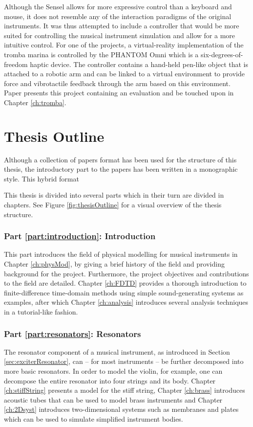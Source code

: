 Although the Sensel allows for more expressive control than a keyboard and mouse, it does not resemble any of the interaction paradigms of the original instruments. It was thus attempted to include a controller that would be more suited for controlling the musical instrument simulation and allow for a more intuitive control.
For one of the projects, a virtual-reality implementation of the tromba marina is controlled by the PHANTOM Omni \cite{phantom} which is a six-degrees-of-freedom haptic device. The controller contains a hand-held pen-like object that is attached to a robotic arm and can be linked to a virtual environment to provide force and vibrotactile feedback through the arm based on this environment. Paper \citeP[E] presents this project containing an evaluation and be touched upon in Chapter \ref{ch:tromba}.

\section{Thesis Outline} 
Although a collection of papers format has been used for the structure of this thesis, the introductory part to the papers has been written in a monographic style. This hybrid format  

This thesis is divided into several parts which in their turn are divided in chapters. See Figure \ref{fig:thesisOutline} for a visual overview of the thesis structure. 

\subsubsection{Part \ref{part:introduction}: Introduction}
This part introduces the field of physical modelling for musical instruments in Chapter \ref{ch:physMod}, by giving a brief history of the field and providing background for the project. Furthermore, the project objectives and contributions to the field are detailed. Chapter \ref{ch:FDTD} provides a thorough introduction to finite-difference time-domain methods using simple sound-generating systems as examples, after which Chapter \ref{ch:analysis} introduces several analysis techniques in a tutorial-like fashion.

\subsubsection{Part \ref{part:resonators}: Resonators}
The resonator component of a musical instrument, as introduced in Section \ref{sec:exciterResonator}, can -- for most instruments -- be further decomposed into more basic resonators. In order to model the violin, for example, one can decompose the entire resonator into four strings and its body. Chapter \ref{ch:stiffString} presents a model for the stiff string, Chapter \ref{ch:brass} introduces acoustic tubes that can be used to model brass instruments and Chapter \ref{ch:2Dsyst} introduces two-dimensional systems such as membranes and plates which can be used to simulate simplified instrument bodies.

